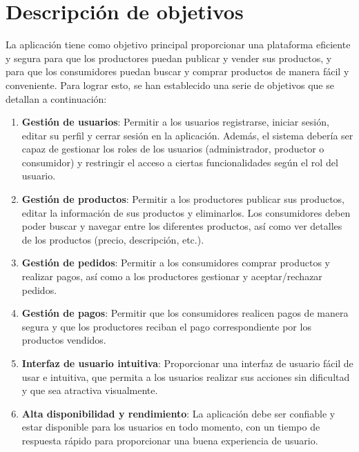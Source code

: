 
\section{Descripción de objetivos}\label{sec:descripcion-objetivos}

La aplicación tiene como objetivo principal proporcionar una plataforma eficiente y segura para que los productores puedan publicar y vender sus productos, y para que los consumidores puedan buscar y comprar productos de manera fácil y conveniente. Para lograr esto, se han establecido una serie de objetivos que se detallan a continuación:

\begin{enumerate}
	\item \textbf{Gestión de usuarios}: Permitir a los usuarios registrarse, iniciar sesión, editar su perfil y cerrar sesión en la aplicación. Además, el sistema debería ser capaz de gestionar los roles de los usuarios (administrador, productor o consumidor) y restringir el acceso a ciertas funcionalidades según el rol del usuario.

	\item \textbf{Gestión de productos}: Permitir a los productores publicar sus productos, editar la información de sus productos y eliminarlos. Los consumidores deben poder buscar y navegar entre los diferentes productos, así como ver detalles de los productos (precio, descripción, etc.).

	\item \textbf{Gestión de pedidos}: Permitir a los consumidores comprar productos y realizar pagos, así como a los productores gestionar y aceptar/rechazar pedidos.

	\item \textbf{Gestión de pagos}: Permitir que los consumidores realicen pagos de manera segura y que los productores reciban el pago correspondiente por los productos vendidos.

	\item \textbf{Interfaz de usuario intuitiva}: Proporcionar una interfaz de usuario fácil de usar e intuitiva, que permita a los usuarios realizar sus acciones sin dificultad y que sea atractiva visualmente.

	\item \textbf{Alta disponibilidad y rendimiento}: La aplicación debe ser confiable y estar disponible para los usuarios en todo momento, con un tiempo de respuesta rápido para proporcionar una buena experiencia de usuario.


\end{enumerate}
